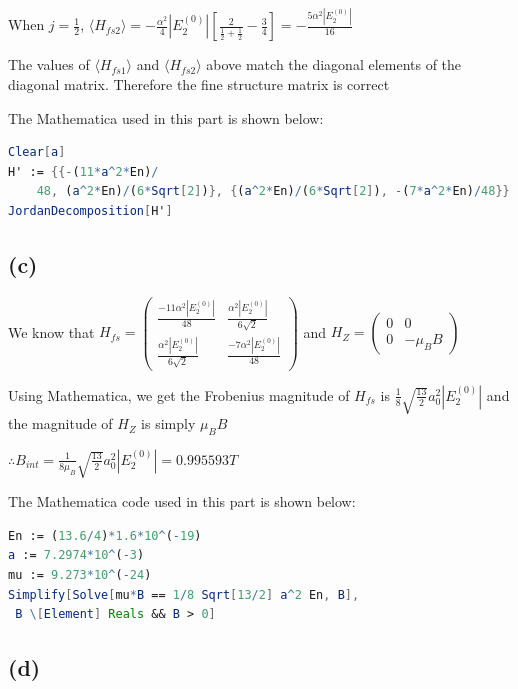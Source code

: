 \documentclass[12pt]{article}
\begin{document}
\begin{spacing}{2.0}
When $j=\frac{1}{2}$, $\langle H_{fs2} \rangle = -\frac{\alpha^2}{4}|E_2^{(0)}| \left[ \frac{2}{\frac{1}{2}+ \frac{1}{2}} - \frac{3}{4} \right]= -\frac{5\alpha^2|E_2^{(0)}|}{16} $

The values of $\langle H_{fs1} \rangle$ and $\langle H_{fs2} \rangle$ above match the diagonal elements of the diagonal matrix. Therefore the fine structure matrix is correct

The Mathematica used in this part is shown below:

\begin{lstlisting}[language=Mathematica,breaklines=true,frame=single]
Clear[a]
H' := {{-(11*a^2*En)/
    48, (a^2*En)/(6*Sqrt[2])}, {(a^2*En)/(6*Sqrt[2]), -(7*a^2*En)/48}}
JordanDecomposition[H']
\end{lstlisting}

\subsection*{(c)}

We know that $H_{fs}= \left(
\begin{array}{cc}
\frac{-11\alpha^2 |E_2^{(0)}|}{48} & \frac{\alpha^2 |E_2^{(0)}|}{6\sqrt{2}} \\
\frac{\alpha^2 |E_2^{(0)}|}{6\sqrt{2}} & \frac{-7\alpha^2 |E_2^{(0)}|}{48}
\end{array}
\right)$ and $H_Z= \left(
\begin{array}{cc}
0 & 0\\
0 & -\mu_B B
\end{array}
\right)$

Using Mathematica, we get the Frobenius magnitude of $H_{fs}$ is $\frac{1}{8} \sqrt{\frac{13}{2}} a_0^2 |E_2^{(0)}|$ and the magnitude of $H_Z$ is simply $\mu_B B$

$\therefore B_{int} = \frac{1}{8 \mu_B} \sqrt{\frac{13}{2}} a_0^2 |E_2^{(0)}| = 0.995593 T$

The Mathematica code used in this part is shown below:

\begin{lstlisting}[language=Mathematica,breaklines=true,frame=single]
En := (13.6/4)*1.6*10^(-19)
a := 7.2974*10^(-3)
mu := 9.273*10^(-24)
Simplify[Solve[mu*B == 1/8 Sqrt[13/2] a^2 En, B],
 B \[Element] Reals && B > 0]
\end{lstlisting}

\subsection*{(d)}


\end{spacing}
\end{document}
